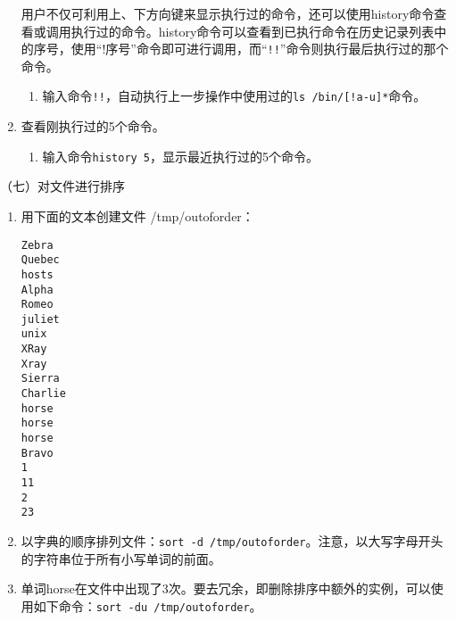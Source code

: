 \begin{enumerate}
    用户不仅可利用上、下方向键来显示执行过的命令，还可以使用history命令查看或调用执行过的命令。history命令可以查看到已执行命令在历史记录列表中的序号，使用“!序号”命令即可进行调用，而“\verb|!!|”命令则执行最后执行过的那个命令。
    \begin{enumerate}
      \item 输入命令\verb|!!|，自动执行上一步操作中使用过的\verb|ls /bin/[!a-u]*|命令。
    \end{enumerate}
  \item 查看刚执行过的5个命令。
    \begin{enumerate}
      \item 输入命令\verb|history 5|，显示最近执行过的5个命令。
    \end{enumerate}
\end{enumerate}

\vspace{0.1in}
（七）对文件进行排序
\begin{enumerate}
  \item 用下面的文本创建文件 /tmp/outoforder：
\begin{verbatim}
Zebra
Quebec
hosts
Alpha
Romeo
juliet
unix
XRay
Xray
Sierra
Charlie
horse
horse
horse
Bravo
1
11
2
23
\end{verbatim}
  \item 以字典的顺序排列文件：\verb|sort -d /tmp/outoforder|。注意，以大写字母开头的字符串位于所有小写单词的前面。
  \item 单词horse在文件中出现了3次。要去冗余，即删除排序中额外的实例，可以使用如下命令：\verb|sort -du /tmp/outoforder|。
\end{enumerate}

